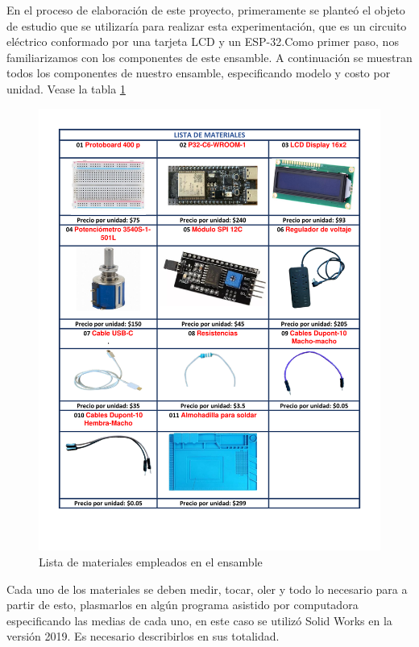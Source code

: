 \begin{itemize}
    En el proceso de elaboración de este proyecto, primeramente se planteó el objeto de estudio que se utilizaría para realizar esta experimentación, que es un circuito eléctrico conformado por una tarjeta LCD y un ESP-32.Como primer paso, nos familiarizamos con los componentes de este ensamble. A continuación se muestran todos los componentes de nuestro ensamble, especificando modelo y costo por unidad. Vease la tabla \ref{fig:lista-materiales}
    \begin{figure}[H]
        \centering
        \includegraphics[scale=0.4]{32/img/listaDeMateriales.pdf}
        \caption{Lista de materiales empleados en el ensamble}
        \label{fig:lista-materiales}
    \end{figure}
%
%
Cada uno de los materiales se deben medir, tocar, oler y todo lo necesario para a partir de esto, plasmarlos en algún programa asistido por computadora especificando las medias de cada uno, en este caso se utilizó Solid Works en la versión 2019. Es necesario describirlos en sus totalidad.


\end{itemize}
